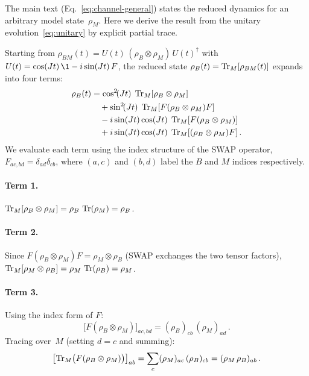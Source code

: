 The main text (Eq.~\eqref{eq:channel-general}) states the reduced
dynamics for an arbitrary model state~$\rho_M$.  Here we derive the
result from the unitary evolution~\eqref{eq:unitary} by explicit
partial trace.

Starting from $\rho_{BM}(t) = U(t)\,(\rho_B \otimes \rho_M)\,
U(t)^\dagger$ with $U(t) = \cos(Jt)\,\1 - i\sin(Jt)\,F$,
the reduced state $\rho_B(t) = \operatorname{Tr}_M[\rho_{BM}(t)]$ expands into
four terms:
\begin{align}
  \rho_B(t)
  &= \cos^2\!(Jt)\;\operatorname{Tr}_M[\rho_B \otimes \rho_M]
  \notag\\
  &\quad + \sin^2\!(Jt)\;\operatorname{Tr}_M[F(\rho_B \otimes \rho_M)F]
  \notag\\
  &\quad - i\sin(Jt)\cos(Jt)\;\operatorname{Tr}_M[F(\rho_B \otimes \rho_M)]
  \notag\\
  &\quad + i\sin(Jt)\cos(Jt)\;\operatorname{Tr}_M[(\rho_B \otimes \rho_M)F] \,.
  \label{eq:four-terms}
\end{align}
We evaluate each term using the index structure of the SWAP operator,
$F_{ac,bd} = \delta_{ad}\delta_{cb}$, where $(a,c)$ and $(b,d)$ label
the $B$ and $M$ indices respectively.

\paragraph{Term 1.}
$\operatorname{Tr}_M[\rho_B \otimes \rho_M] = \rho_B\,\operatorname{Tr}(\rho_M) = \rho_B$.

\paragraph{Term 2.}
Since $F(\rho_B \otimes \rho_M)F = \rho_M \otimes \rho_B$ (SWAP
exchanges the two tensor factors),
$\operatorname{Tr}_M[\rho_M \otimes \rho_B] = \rho_M\,\operatorname{Tr}(\rho_B) = \rho_M$.

\paragraph{Term 3.}
Using the index form of $F$:
\begin{equation}
  \bigl[F(\rho_B \otimes \rho_M)\bigr]_{ac,bd}
  = (\rho_B)_{cb}\,(\rho_M)_{ad} \,.
  \label{eq:term3-index}
\end{equation}
Tracing over~$M$ (setting $d = c$ and summing):
\begin{equation}
  \bigl[\operatorname{Tr}_M\bigl(F(\rho_B \otimes \rho_M)\bigr)\bigr]_{ab}
  = \sum_c (\rho_M)_{ac}\,(\rho_B)_{cb}
  = (\rho_M\,\rho_B)_{ab} \,.
  \label{eq:term3-trace}
\end{equation}

